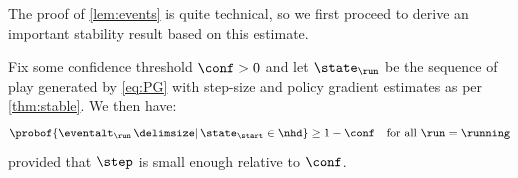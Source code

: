 The proof of \cref{lem:events} is quite technical, so we first proceed to derive an important stability result based on this estimate.

\begin{proposition}
\label{prop:contain}
Fix some confidence threshold $\conf>0$ and let $\curr$ be the sequence of play generated by \eqref{eq:PG} with step-size and policy gradient estimates as per \cref{thm:stable}.
We then have:
\begin{equation}
\label{eq:contain}
\probof{\curr[\eventalt] \given \init\in\nhd}
	\geq 1-\conf
	\quad
	\text{for all $\run=\running$}
\end{equation}
provided that $\step$ is small enough  relative to $\conf$.
\end{proposition}

